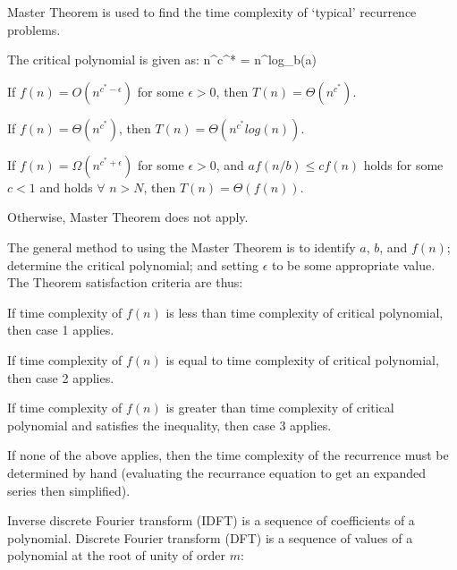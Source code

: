 
        Master Theorem is used to find the time complexity of `typical' recurrence problems.

        The critical polynomial is given as:
        \startformula n^{c^{*}} = n^{log_{b}(a)} \stopformula

        \startitemize[n]
            \item If $f(n) = O(n^{c^{*} - \epsilon})$ for some $\epsilon > 0$, then $T(n) = \Theta(n^{c^{*}})$.
            \item If $f(n) = \Theta(n^{c^{*}})$, then $T(n) = \Theta(n^{c^{*}}log(n))$.
            \item If $f(n) = \Omega(n^{c^{*} + \epsilon})$ for some $\epsilon > 0$, and $af(n/b) \leq cf(n)$ holds for some $c < 1$ and holds $\forall$ $n > N$, then $T(n) = \Theta(f(n))$.
            \item Otherwise, Master Theorem does not apply.
        \stopitemize

        The general method to using the Master Theorem is to identify $a$, $b$, and $f(n)$; determine the critical polynomial; and setting $\epsilon$ to be some appropriate value. The Theorem satisfaction criteria are thus:
        \startitemize
            \item If time complexity of $f(n)$ is less than time complexity of critical polynomial, then case 1 applies.
            \item If time complexity of $f(n)$ is equal to time complexity of critical polynomial, then case 2 applies.
            \item If time complexity of $f(n)$ is greater than time complexity of critical polynomial and satisfies the inequality, then case 3 applies.
            \item If none of the above applies, then the time complexity of the recurrence must be determined by hand (evaluating the recurrance equation to get an expanded series then simplified).
        \stopitemize

\subject{Fast Fourier Transform} %

    Inverse discrete Fourier transform (IDFT) is a sequence of coefficients of a polynomial. Discrete Fourier transform (DFT) is a sequence of values of a polynomial at the root of unity of order $m$:
    \startformula{}\stopformula

